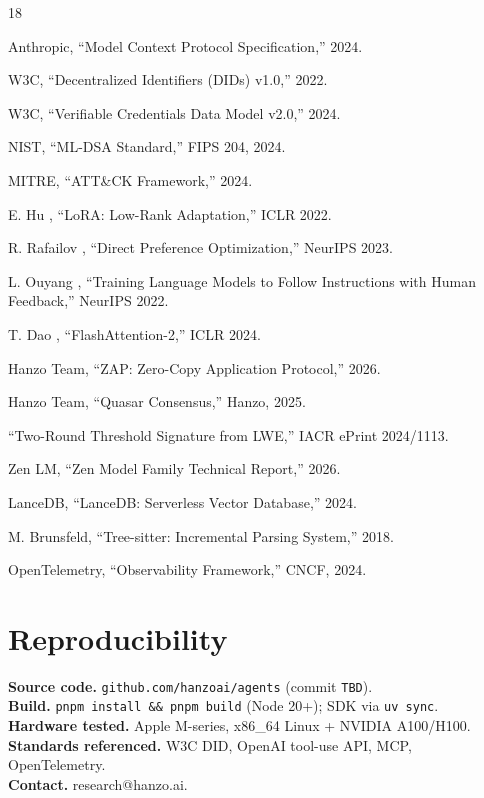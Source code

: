 \documentclass[11pt,letterpaper]{article}
\begin{document}
\begin{thebibliography}{18}

 Anthropic, ``Model Context Protocol Specification,'' 2024.

 W3C, ``Decentralized Identifiers (DIDs) v1.0,'' 2022.

 W3C, ``Verifiable Credentials Data Model v2.0,'' 2024.

 NIST, ``ML-DSA Standard,'' FIPS 204, 2024.

 MITRE, ``ATT\&CK Framework,'' 2024.

 E. Hu \etal, ``LoRA: Low-Rank Adaptation,'' ICLR 2022.

 R. Rafailov \etal, ``Direct Preference Optimization,'' NeurIPS 2023.

 L. Ouyang \etal, ``Training Language Models to Follow Instructions with Human Feedback,'' NeurIPS 2022.

 T. Dao \etal, ``FlashAttention-2,'' ICLR 2024.

 Hanzo Team, ``ZAP: Zero-Copy Application Protocol,'' 2026.

 Hanzo Team, ``Quasar Consensus,'' Hanzo, 2025.

 ``Two-Round Threshold Signature from LWE,'' IACR ePrint 2024/1113.

 Zen LM, ``Zen Model Family Technical Report,'' 2026.

 LanceDB, ``LanceDB: Serverless Vector Database,'' 2024.

 M. Brunsfeld, ``Tree-sitter: Incremental Parsing System,'' 2018.

 OpenTelemetry, ``Observability Framework,'' CNCF, 2024.

\end{thebibliography}

\section*{Reproducibility}
\textbf{Source code.} \texttt{github.com/hanzoai/agents} (commit \texttt{TBD}).\\
\textbf{Build.} \texttt{pnpm install \&\& pnpm build} (Node 20+); SDK via \texttt{uv sync}.\\
\textbf{Hardware tested.} Apple M-series, x86\_64 Linux + NVIDIA A100/H100.\\
\textbf{Standards referenced.} W3C DID, OpenAI tool-use API, MCP, OpenTelemetry.\\
\textbf{Contact.} research@hanzo.ai.
\end{document}
